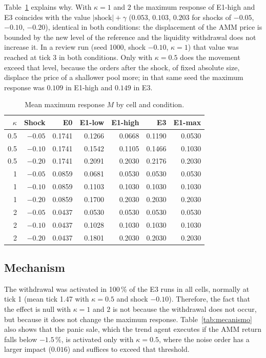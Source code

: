 Table~\ref{tab:respuesta} explains why. With $\kappa=1$ and $2$ the maximum response of E1-high and E3 coincides with the value $|\text{shock}|+\gamma$ ($0.053$, $0.103$, $0.203$ for shocks of $-0.05$, $-0.10$, $-0.20$), identical in both conditions: the displacement of the AMM price is bounded by the new level of the reference and the liquidity withdrawal does not increase it. In a review run (seed 1000, shock $-0.10$, $\kappa=1$) that value was reached at tick 3 in both conditions. Only with $\kappa=0.5$ does the movement exceed that level, because the orders after the shock, of fixed absolute size, displace the price of a shallower pool more; in that same seed the maximum response was $0.109$ in E1-high and $0.149$ in E3.

\begin{table}[htbp]
\centering
\caption{Mean maximum response $M$ by cell and condition.}
\label{tab:respuesta}
\small
\begin{tabular}{@{}rrrrrrr@{}}
\toprule
$\kappa$ & Shock & E0 & E1-low & E1-high & E3 & E1-max \\
\midrule
0.5 & $-0.05$ & 0.1741 & 0.1266 & 0.0668 & 0.1190 & 0.0530 \\
0.5 & $-0.10$ & 0.1741 & 0.1542 & 0.1105 & 0.1466 & 0.1030 \\
0.5 & $-0.20$ & 0.1741 & 0.2091 & 0.2030 & 0.2176 & 0.2030 \\
1 & $-0.05$ & 0.0859 & 0.0681 & 0.0530 & 0.0530 & 0.0530 \\
1 & $-0.10$ & 0.0859 & 0.1103 & 0.1030 & 0.1030 & 0.1030 \\
1 & $-0.20$ & 0.0859 & 0.1700 & 0.2030 & 0.2030 & 0.2030 \\
2 & $-0.05$ & 0.0437 & 0.0530 & 0.0530 & 0.0530 & 0.0530 \\
2 & $-0.10$ & 0.0437 & 0.1028 & 0.1030 & 0.1030 & 0.1030 \\
2 & $-0.20$ & 0.0437 & 0.1801 & 0.2030 & 0.2030 & 0.2030 \\
\bottomrule
\end{tabular}
\end{table}

\subsection{Mechanism}

The withdrawal was activated in 100\,\% of the E3 runs in all cells, normally at tick 1 (mean tick 1.47 with $\kappa=0.5$ and shock $-0.10$). Therefore, the fact that the effect is null with $\kappa=1$ and $2$ is not because the withdrawal does not occur, but because it does not change the maximum response. Table~\ref{tab:mecanismo} also shows that the panic sale, which the trend agent executes if the AMM return falls below $-1.5\,\%$, is activated only with $\kappa=0.5$, where the noise order has a larger impact ($0.016$) and suffices to exceed that threshold.

